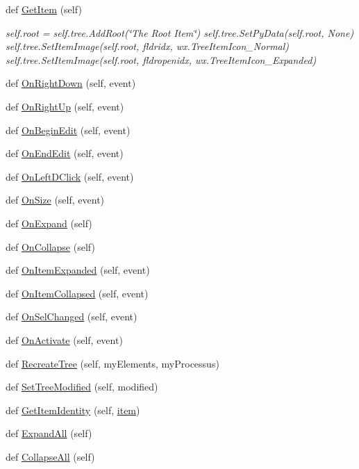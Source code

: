 \begin{DoxyCompactItemize}
\item 
def \hyperlink{namespacetree_a2d9ace69c820aa1a47a130d6f2563dd5}{Get\+Item} (self)
\begin{DoxyCompactList}\small\item\em self.\+root = self.\+tree.\+Add\+Root(\char`\"{}\+The Root Item\char`\"{}) self.\+tree.\+Set\+Py\+Data(self.\+root, None) self.\+tree.\+Set\+Item\+Image(self.\+root, fldridx, wx.\+Tree\+Item\+Icon\+\_\+\+Normal) self.\+tree.\+Set\+Item\+Image(self.\+root, fldropenidx, wx.\+Tree\+Item\+Icon\+\_\+\+Expanded) \end{DoxyCompactList}\item 
def \hyperlink{namespacetree_a218efc50b670a3786469cc5bdc6ee9a4}{On\+Right\+Down} (self, event)
\item 
def \hyperlink{namespacetree_a45b7b513a1c37a489b21bdc78fecf4c6}{On\+Right\+Up} (self, event)
\item 
def \hyperlink{namespacetree_a3dbf42d21efffc543db2f43647ed898f}{On\+Begin\+Edit} (self, event)
\item 
def \hyperlink{namespacetree_a38eb09851484434f68ca96836595f313}{On\+End\+Edit} (self, event)
\item 
def \hyperlink{namespacetree_a83f9b4fb81eaf28417f7c262de8236eb}{On\+Left\+D\+Click} (self, event)
\item 
def \hyperlink{namespacetree_a5265bf4a76eac8d36d9b878ee3bb3db6}{On\+Size} (self, event)
\item 
def \hyperlink{namespacetree_a6c840d336c4b169b8f94f0bdd7ac2cfe}{On\+Expand} (self)
\item 
def \hyperlink{namespacetree_ac7e705f7fe24b4bc72f8c968cf97c8db}{On\+Collapse} (self)
\item 
def \hyperlink{namespacetree_a961177b1c32b2f36a5101831efbe68c6}{On\+Item\+Expanded} (self, event)
\item 
def \hyperlink{namespacetree_a4244a87b469f03af27b7d513f8fd2dfe}{On\+Item\+Collapsed} (self, event)
\item 
def \hyperlink{namespacetree_aa96fa0cc8c71a236f802bbac0c41707a}{On\+Sel\+Changed} (self, event)
\item 
def \hyperlink{namespacetree_a4e5bad86778717f20ed7754225b2d6f9}{On\+Activate} (self, event)
\item 
def \hyperlink{namespacetree_af52f98081d696417bca581a778074e7a}{Recreate\+Tree} (self, my\+Elements, my\+Processus)
\item 
def \hyperlink{namespacetree_ac7cd7dfad49d81ece04754d4b9c861c6}{Set\+Tree\+Modified} (self, modified)
\item 
def \hyperlink{namespacetree_a0aa735bae0dc8e20d0aecaba52fc2754}{Get\+Item\+Identity} (self, \hyperlink{namespacetree_a2b39c5c8d8b749cd12223e1f89868f11}{item})
\item 
def \hyperlink{namespacetree_a68fefd05a9fba45bef73547aabebed51}{Expand\+All} (self)
\item 
def \hyperlink{namespacetree_a8440c45c468184b3cc385934d03bf96f}{Collapse\+All} (self)
\end{DoxyCompactItemize}
